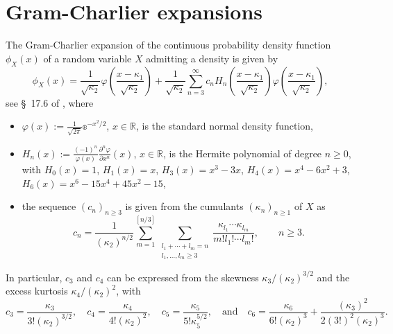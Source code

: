 \documentclass[12pt]{article}
\def\real{{\mathord{\mathbb R}}}
\newcommand{\re}{\mathbb{e}}
\numberwithin{equation}{section}
\begin{document}
\section{Gram-Charlier expansions}
\label{s5}
\noindent
 The Gram-Charlier expansion of the continuous
probability density function
$\phi_X(x)$ of a random variable $X$ admitting a density
is given by 
\begin{equation} 
\label{gram_charlier}
\phi_X(x)=
\frac{1}{\sqrt{\kappa_2}}
\varphi \left( \frac{x-\kappa_1}{\sqrt{\kappa_2}}\right)
+
\frac{1}{\sqrt{\kappa_2}}
\sum_{n=3}^{\infty}
c_n H_n\left(
\frac{x-\kappa_1}{\sqrt{\kappa_2}} \right)
\varphi \left( \frac{x-\kappa_1}{\sqrt{\kappa_2}}\right),
\end{equation}
 see \S~17.6 of \cite{cramer}, where 
\begin{itemize}
  \item $\displaystyle \varphi(x) :=\frac{1}{\sqrt{2\pi}}\re^{-x^2/2}$,
 $ x\in \real$,
    is the standard normal density function,
    \item 
$\displaystyle 
H_n(x):=\frac{(-1)^n}{\varphi(x)}
\frac{\partial^n \varphi}{\partial x^n}(x)$,
 $x\in\real$, 
 is the Hermite polynomial of degree $n\geq 0$, with
$H_0(x)=1$, 
$H_1(x)=x$, 
$H_3(x)=x^3-3x$,
$H_4(x)=x^4-6x^2+3$, 
 $H_6(x)=x^6-15x^4+45x^2-15$,
 \item 
  the sequence $(c_n)_{n\geq 3}$ is given from the cumulants $(\kappa_n)_{n\geq 1}$
of $X$ as 
$$ 
c_n = \frac{1}{(\kappa_2)^{n/2}}
\sum_{m=1}^{[n/3]}
\sum_{\substack{l_1+\cdots+l_m=n\\
{l_1,\ldots , l_m \geq 3}}}\frac{\kappa_{l_1}\cdots \kappa_{l_m}}{m! l_1!\cdots l_m!}, \qquad n\geq 3.
$$ 
\end{itemize} 
 In particular, $c_3$ and $c_4$ can be expressed from 
 the skewness $\kappa_3/(\kappa_2)^{3/2}$ and
 the excess kurtosis $\kappa_4/(\kappa_2)^2$, with 
$$ 
c_3 = \frac{\kappa_3}{3! (\kappa_2)^{3/2}}, 
\quad
c_4 = \frac{\kappa_4}{4! (\kappa_2)^2}, 
\quad 
c_5 = \frac{\kappa_5}{5! \kappa_5^{5/2}},
\quad
\mbox{and}
\quad
 c_6 =
 \frac{\kappa_6}{6! (\kappa_2)^3}
 +
  \frac{(\kappa_3)^2}{2(3!)^2 (\kappa_2)^3}
.
$$
\end{document}
